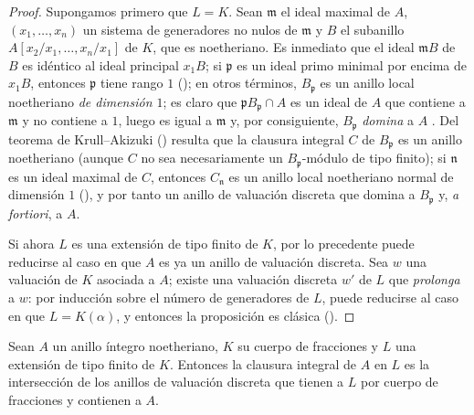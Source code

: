 \documentclass[oneside,10pt]{amsart}
\let\EGAOriginalLabel\label
\renewcommand{\label}[1]{\phantomsection\EGAOriginalLabel{#1}}
\begin{document}
\begin{proof}
Supongamos primero que $L=K$.
Sean $\mathfrak{m}$ el ideal maximal de $A$, $(x_1,\ldots,x_n)$ un sistema de generadores no nulos de $\mathfrak{m}$ y $B$ el subanillo
$A[x_2/x_1,\ldots,x_n/x_1]$
de $K$, que es noetheriano.
Es inmediato que el ideal $\mathfrak{m}B$ de $B$ es idéntico al ideal principal $x_1B$;
si $\mathfrak{p}$ es un ideal primo minimal por encima de $x_1B$, entonces $\mathfrak{p}$ tiene rango $1$ (\cite[t.~I, p.~277]{I-13});
en otros términos, $B_{\mathfrak{p}}$ es un anillo local noetheriano \emph{de dimensión $1$};
es claro que $\mathfrak{p}B_{\mathfrak{p}}\cap A$ es un ideal de $A$ que contiene a $\mathfrak{m}$ y no contiene a $1$, luego es igual a $\mathfrak{m}$ y, por consiguiente, $B_{\mathfrak{p}}$ \emph{domina} a $A$ .
Del teorema de Krull--Akizuki (\cite[p.~293]{II-25}) resulta que la clausura integral $C$ de $B_{\mathfrak{p}}$ es un anillo noetheriano (aunque $C$ no sea necesariamente un $B_{\mathfrak{p}}$-módulo de tipo finito);
si $\mathfrak{n}$ es un ideal maximal de $C$, entonces $C_{\mathfrak{n}}$ es un anillo local noetheriano normal de dimensión $1$ (\cite[p.~295]{II-25}), y por tanto un anillo de valuación discreta que domina a $B_{\mathfrak{p}}$ y, \emph{a fortiori}, a $A$.

Si ahora $L$ es una extensión de tipo finito de $K$, por lo precedente puede reducirse al caso en que $A$ es ya un anillo de valuación discreta.
Sea $w$ una valuación de $K$ asociada a $A$;
existe una valuación discreta $w'$ de $L$ que \emph{prolonga} a $w$: por inducción sobre el número de generadores de $L$, puede reducirse al caso en que $L=K(\alpha)$, y entonces la proposición es clásica (\cite[p.~106]{II-24}).
\end{proof}


\begin{corollary}[7.1.8]
\label{II.7.1.8-fr}
Sean $A$ un anillo íntegro noetheriano, $K$ su cuerpo de fracciones y $L$ una extensión de tipo finito de $K$.
Entonces la clausura integral de $A$ en $L$ es la intersección de los anillos de valuación discreta que tienen a $L$ por cuerpo de fracciones y contienen a $A$.
\end{corollary}
\end{document}
